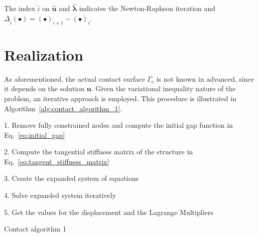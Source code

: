 \documentclass[10pt,a4paper]{article}
\begin{document}
The index $\hat{i}$ on $\hat{\mathbf{u}}$ and $\hat{\boldsymbol{\lambda}}$ indicates the Newton-Raphson iteration and $\Delta_{\hat{i}} (\bullet) = (\bullet)_{\hat{i} + 1} - (\bullet)_{\hat{i}}$.

\section{Realization}

As aforementioned, the actual contact surface $\Gamma_{\text{c}}$ is not known in advanced, since it depends on the solution $\mathbf{u}$. Given the variational inequality nature of the problem, an iterative approach is employed. This procedure is illustrated in Algorithm~\ref{alg:contact_algorithm_1}. \\

\begin{algorithm}[H]

	1. Remove fully constrained nodes and compute the initial gap function in Eq.~\eqref{eq:initial_gap} \; \vspace*{5pt}
	
    2. Compute the tangential stiffness matrix of the structure in Eq.~\eqref{eq:tangent_stiffness_matrix} \;	\vspace*{5pt}
    
    3. Create the expanded system of equations \;	\vspace*{5pt}
    
    4. Solve expanded system iteratively \;	\vspace*{5pt}

	\vspace*{5pt}
	5. Get the values for the displacement and the Lagrange Multipliers \; \vspace*{5pt}

	\caption{Contact algorithm 1}
	
	\label{alg:contact_algorithm_1}
\end{algorithm}
\end{document}

